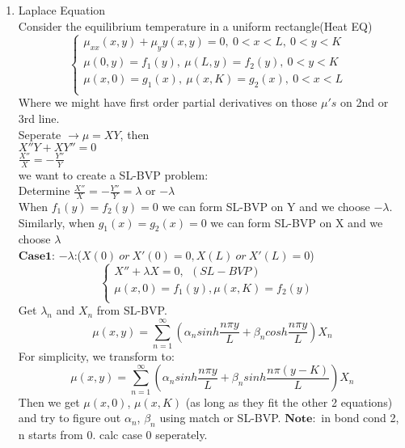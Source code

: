 \documentclass[10pt]{article}
\begin{document}
\begin{multicols}{2}
\begin{enumerate}
	\item Laplace Equation\\
		Consider the equilibrium temperature in a uniform rectangle(Heat EQ)
		\begin{equation}
			\left\{
			\begin{array}{lr}
			\mu_{xx}(x,y) + \mu_yy(x,y) = 0, \ 0<x<L, \ 0<y<K&\\
			\mu(0,y) = f_1(y), \ \mu(L, y) = f_2(y),  \ 0<y<K &\\
			\mu(x,0)=g_1(x), \ \mu(x,K) = g_2(x), \ 0 < x < L\\
			\end{array}
			\right.
		\end{equation}
		Where we might have first order partial derivatives on those $\mu's$ on 2nd or 3rd line.\\
		Seperate $\rightarrow \mu = XY$, then\\
		$X''Y+XY'' = 0$\\
		$\frac{X''}{X} = -\frac{Y''}{Y}$\\
		we want to create a SL-BVP problem:\\
		Determine $\frac{X''}{X} = -\frac{Y''}{Y} = \lambda$ or $-\lambda$\\
		When $f_1(y) = f_2(y) = 0$ we can form SL-BVP on Y and we choose $-\lambda$. Similarly, when $g_1(x)= g_2(x) = 0$ we can form SL-BVP on X and we choose $\lambda$\\
		$\mathbf{Case1}$: $-\lambda$:($X(0) \ or \ X'(0) = 0, X(L) \ or \ X'(L) = 0$)\\
		\begin{equation}
		\left\{
		\begin{array}{lr}
		X''+\lambda X = 0, \ \ (SL-BVP)&\\
		\mu(x, 0) = f_1(y), \mu(x, K) = f_2(y)\\
		\end{array}
		\right.
		\end{equation}
		Get $\lambda_n$ and $X_n$ from SL-BVP.
		$$\mu(x,y) = \sum_{n = 1}^{\infty} (\alpha_n sinh\frac{n \pi y}{L} + \beta_n cosh\frac{n \pi y}{L}) X_n$$
		For simplicity, we transform to:\\
		$$\mu(x,y) = \sum_{n = 1}^{\infty} (\alpha_n sinh\frac{n \pi y}{L} + \beta_n sinh\frac{n \pi (y-K)}{L}) X_n$$
		Then we get $\mu(x,0)$, $\mu(x,K)$ (as long as they fit the other 2 equations) and try to figure out $\alpha_n$, $\beta_n$ using match or SL-BVP. $\mathbf{Note}:$ in bond cond 2, n starts from 0. calc case 0 seperately.\\

\end{enumerate}
\end{multicols}
\end{document}

